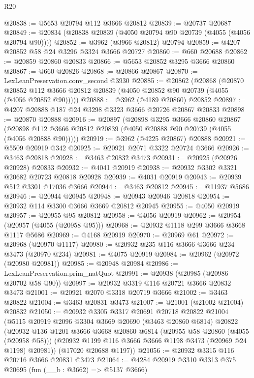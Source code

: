 \begin{lexlean}{R20}
\begin{coremodule}
@20838 := @5653 @20794 @112 @3666 @20812
@20839 := @20737 @20687
@20849 := @20834 (@20838 @20839 (@4050 @20794 @90 @20739 (@4055 (@4056 @20794 @90))))
@20852 := @3962 (@3966 @20812) @20794
@20859 := @4207 @20852 @58 @24 @3296 @3324 @3666 @20727
@20860 := @660 @20688
@20862 := @20859 @20860 @20833
@20866 := @5653 @20852 @3295 @3666 @20860
@20867 := @660 @20826
@20868 := @20866 @20867
@20870 := LexLeanPreservation.conv_second @3930
@20885 := @20862
    (@20868
      (@20870 @20852 @112 @3666 @20812 @20839 (@4050 @20852 @90 @20739 (@4055 (@4056 @20852 @90)))))
@20888 := @3962 (@4189 @20860) @20852
@20897 := @4207 @20888 @187 @24 @3298 @3323 @3666 @20726 @20867 @20833
@20898 := @20870 @20888
@20916 := @20897
    (@20898
      @3295
      @3666
      @20860
      @20867
      (@20898 @112 @3666 @20812 @20839 (@4050 @20888 @90 @20739 (@4055 (@4056 @20888 @90)))))
@20919 := @3962 (@4225 @20867) @20888
@20921 := @5509 @20919 @342
@20925 := @20921 @2071 @3322 @20724 @3666
@20926 := @3463 @20818
@20928 := @3463 @20832 @3473
@20931 := @20925 (@20926 @20928) @20833
@20932 := @4041 @20919
@20938 := @20932 @3302 @3321 @20682 @20723 @20818 @20928
@20939 := @4031 @20919
@20943 := @20939 @512 @3301 @17036 @3666
@20944 := @3463 @20812
@20945 := @11937 @5686
@20946 := @20944 @20945
@20948 := @20943 @20946 @20818
@20954 := @20932 @114 @3300 @3666 @3669 @20812 @20945
@20955 := @4050 @20919
@20957 := @20955 @95 @20812
@20958 := @4056 @20919
@20962 := @20954 (@20957 (@4055 (@20958 @95)))
@20968 := @20932 @1118 @299 @3666 @3668 @1117 @5686
@20969 := @4168 @20919
@20970 := @20969 @61
@20972 := @20968 (@20970 @1117)
@20980 := @20932 @235 @116 @3666 @3666 @234 @3473 (@20970 @234)
@20981 := @4075 @20919
@20984 := @20962 (@20972 (@20980 @20981))
@20985 := @20948 @20984
@20986 := LexLeanPreservation.prim_natQuot
@20991 := @20938 (@20985 (@20986 @20702 @58 @90))
@20997 := @20932 @3319 @116 @20721 @3666 @20832 @3473
@21001 := @20921 @2070 @3318 @20719 @3666
@21002 := @3463 @20822
@21004 := @3463 @20831 @3473
@21007 := @21001 (@21002 @21004) @20832
@21050 := @20932
    @3305
    @3317
    @20691
    @20718
    @20822
    @21004
    (@5115
      @20919
      @2096
      @3304
      @3669
      @20690
      (@3463 @20860 @6814)
      @20822
      (@20932
        @136
        @1201
        @3666
        @3668
        @20860
        @6814
        (@20955 @58 @20860 (@4055 (@20958 @58)))
        (@20932 @1199 @116 @3666 @3666 @1198 @3473 (@20969 @24 @1198) @20981))
      (@17020 @20688 @1197))
@21056 := @20932 @3315 @116 @20716 @3666 @20831 @3473
@21064 := @4284 @20919 @3310 @3313 @375 @20695 (fun (__b : @3662) => @5137 @3666)

\end{coremodule}
\end{lexlean}
